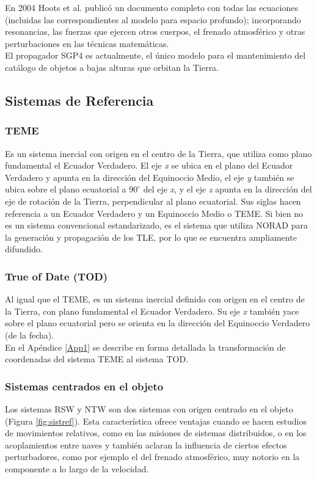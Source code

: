 {En 2004 Hoots et al. public\'o un documento completo con todas las ecuaciones (incluidas las correspondientes al modelo para espacio profundo); incorporando resonancias, las fuerzas que ejercen otros cuerpos, el frenado atmosf\'erico y otras perturbaciones en las t\'ecnicas matem\'aticas.\\

El propagador SGP4 es actualmente, el \'unico modelo para el mantenimiento del cat\'alogo de objetos a bajas alturas que orbitan la Tierra. 

\subsection{Sistemas de Referencia}\label{subsec:sistRef}

\subsubsection*{\ac{TEME}}
 Es un sistema inercial con origen en el centro de la Tierra, que utiliza como plano fundamental el Ecuador Verdadero. El eje {\it{x}} se ubica en el plano del Ecuador Verdadero y apunta en la direcci\'on del Equinoccio Medio, el eje {\it{y}} tambi\'en se ubica sobre el plano ecuatorial a $90^{\circ}$ del eje {\it{x}}, y el eje {\it{z}} apunta en la direcci\'on del eje de rotaci\'on de la Tierra, perpendicular al plano ecuatorial. Sus siglas hacen referencia a un Ecuador Verdadero y un Equinoccio Medio o \ac{TEME}. Si bien no es un sistema convencional estandarizado, es el sistema que utiliza NORAD para la generaci\'on y propagaci\'on de los TLE, por lo que se encuentra ampliamente difundido.
 
\subsubsection*{True of Date (TOD)}}
 Al igual que el TEME, es un sistema inercial definido con origen en el centro de la Tierra, con plano fundamental el Ecuador Verdadero. Su eje {\it{x}} tambi\'en yace sobre el plano ecuatorial pero se orienta en la direcci\'on del Equinoccio Verdadero (de la fecha).\\
 En el Ap\'endice \ref{App1} se describe en forma detallada la transformaci\'on de coordenadas del sistema TEME al sistema TOD.
 
\subsubsection*{Sistemas centrados en el objeto}
Los sistemas \ac{RSW} y \ac{NTW} son dos sistemas con origen centrado en el objeto (Figura \ref{fig:sistref}). Esta caracter\'istica ofrece ventajas cuando se hacen estudios de movimientos relativos, como en las misiones de sistemas distribuidos, o en los acoplamientos entre naves y tambi\'en aclaran la influencia de ciertos efectos perturbadores, como por ejemplo el del frenado atmosf\'erico, muy notorio en la componente a lo largo de la velocidad.\\

